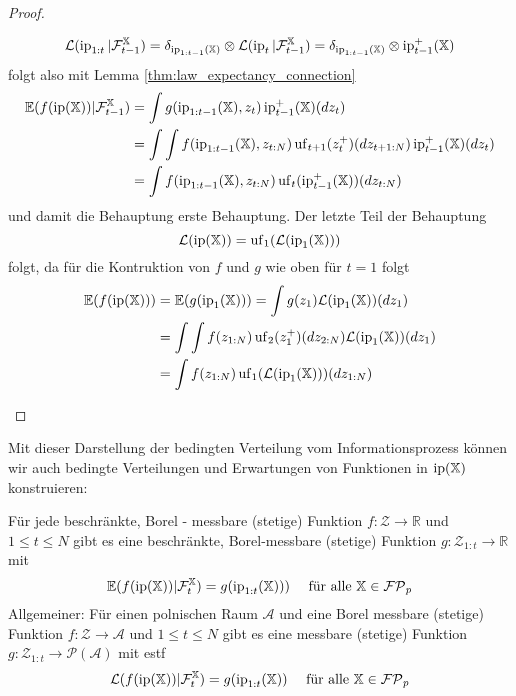 \begin{proof}
\begin{enumerate}[(i)]
    $$\mathcal{L}(\operatorname{ip}_{1:t}\vert \mathcal{F}_{t-1}^\mathbb{X})=\delta_{\operatorname{ip}_{1:t-1}(\mathbb{X})}\otimes \mathcal{L}(\operatorname{ip}_t\vert \mathcal{F}_{t-1}^\mathbb{X})=\delta_{\operatorname{ip}_{1:t-1}(\mathbb{X})}\otimes \operatorname{ip}_{t-1}^+(\mathbb{X})$$
    folgt also mit Lemma \ref{thm:law_expectancy_connection}
    \begin{align*}
    \mathbb{E}(f(\operatorname{ip}(\mathbb{X}))\vert \mathcal{F}_{t-1}^\mathbb{X}) &= \int g(\operatorname{ip}_{1:t-1}(\mathbb{X}), z_t) \operatorname{ip}_{t-1}^+(\mathbb{X})(dz_t) \\
    &= \int \int f(\operatorname{ip}_{1:t-1}(\mathbb{X}), z_{t:N}) \operatorname{uf}_{t+1}(z_t^+)(dz_{t+1:N})\operatorname{ip}_{t-1}^+(\mathbb{X})(dz_t) \\
    &= \int f(\operatorname{ip}_{1:t-1}(\mathbb{X}), z_{t:N}) \operatorname{uf}_{t}(\operatorname{ip}_{t-1}^+(\mathbb{X}))(dz_{t:N})
    \end{align*}
    und damit die Behauptung erste Behauptung.
    Der letzte Teil der Behauptung
    $$\mathcal{L}(\operatorname{ip}(\mathbb{X}))=\operatorname{uf}_1(\mathcal{L}(\operatorname{ip}_1(\mathbb{X})))$$
    folgt, da für die Kontruktion von $f$ und $g$ wie oben für $t=1$ folgt
    \begin{align*}
        \mathbb{E}(f(\operatorname{ip}(\mathbb{X}))) &= \mathbb{E}(g(\operatorname{ip}_1(\mathbb{X}))) = \int g(z_1) \mathcal{L}(\operatorname{ip}_1(\mathbb{X}))(dz_1) \\
        &= \int \int f(z_{1:N}) \operatorname{uf}_{2}(z_1^+)(dz_{2:N}) \mathcal{L}(\operatorname{ip}_1(\mathbb{X}))(dz_1) \\
        &= \int f(z_{1:N}) \operatorname{uf}_1(\mathcal{L}(\operatorname{ip}_1(\mathbb{X})))(dz_{1:N})
    \end{align*}
\end{enumerate}
\end{proof}
Mit dieser Darstellung der bedingten Verteilung vom Informationsprozess können wir auch bedingte Verteilungen und Erwartungen von Funktionen in $\operatorname{ip}(\mathbb{X})$ konstruieren:
\begin{lemma}\label{thm:self_awareness}
Für jede beschränkte, Borel - messbare (stetige) Funktion $f:\mathcal{Z}\rightarrow \mathbb{R}$ und $1\leq t\leq N$ gibt es eine beschränkte, Borel-messbare (stetige) Funktion $g:\mathcal{Z}_{1:t}\rightarrow \mathbb{R}$ mit 
$$\mathbb{E}(f(\operatorname{ip}(\mathbb{X}))\vert \mathcal{F}_t^\mathbb{X}) = g(\operatorname{ip}_{1:t}(\mathbb{X}))) \quad \text{ für alle }\mathbb{X}\in\mathcal{FP}_p$$
Allgemeiner: Für einen polnischen Raum $\mathcal{A}$ und eine Borel messbare (stetige) Funktion $f:\mathcal{Z}\rightarrow \mathcal{A}$ und $1\leq t\leq N$ gibt es eine messbare (stetige) Funktion $g:\mathcal{Z}_{1:t}\rightarrow \mathcal{P}(\mathcal{A})$ mit estf
$$\mathcal{L}(f(\operatorname{ip}(\mathbb{X}))\vert \mathcal{F}_t^\mathbb{X})=g(\operatorname{ip}_{1:t}(\mathbb{X}))\quad\text{ für alle } \mathbb{X}\in\mathcal{FP}_p$$
\end{lemma}
